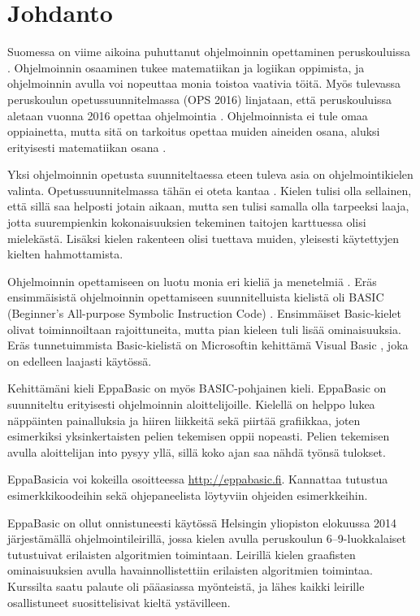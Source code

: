 
\section{Johdanto}
Suomessa on viime aikoina
puhuttanut ohjelmoinnin
opettaminen peruskouluissa
\cite{hs_kiuru}\cite{hs_eka}.
Ohjelmoinnin osaaminen
tukee matematiikan ja logiikan
oppimista, ja ohjelmoinnin
avulla voi nopeuttaa monia
toistoa vaativia töitä.
Myös tulevassa peruskoulun
opetussuunnitelmassa (OPS 2016)
linjataan, että peruskouluissa aletaan
vuonna 2016 opettaa ohjelmointia
\cite{OPS_2016}.
Ohjelmoinnista ei tule omaa oppiainetta,
mutta sitä on tarkoitus opettaa muiden
aineiden osana, aluksi erityisesti
matematiikan osana \cite{OPS_2016}\cite{hs_eka}.

Yksi ohjelmoinnin opetusta suunniteltaessa eteen tuleva
asia on ohjelmointikielen valinta.
Opetussuunnitelmassa tähän ei
oteta kantaa \cite{hs_eka}.
Kielen tulisi olla sellainen,
että sillä saa helposti jotain aikaan,
mutta sen tulisi samalla olla tarpeeksi laaja,
jotta suurempienkin kokonaisuuksien tekeminen
taitojen karttuessa olisi mielekästä.
Lisäksi kielen rakenteen olisi tuettava muiden,
yleisesti käytettyjen kielten hahmottamista.

Ohjelmoinnin opettamiseen
on luotu monia eri kieliä ja menetelmiä
\cite{language_history}.
Eräs ensimmäisistä ohjelmoinnin opettamiseen
suunnitelluista kielistä oli BASIC
(Beginner's All-purpose Symbolic Instruction Code)
\cite{basic}.
Ensimmäiset Basic-kielet olivat toiminnoiltaan rajoittuneita,
mutta pian kieleen tuli lisää ominaisuuksia.
Eräs tunnetuimmista Basic-kielistä on
Microsoftin kehittämä Visual Basic
\cite{vb.net},
joka on edelleen laajasti käytössä.

Kehittämäni kieli EppaBasic
on myös
BASIC-pohjainen kieli.
EppaBasic on suunniteltu
erityisesti ohjelmoinnin aloittelijoille.
Kielellä on helppo lukea
näppäinten painalluksia
ja hiiren liikkeitä
sekä piirtää grafiikkaa,
joten esimerkiksi yksinkertaisten
pelien tekemisen oppii nopeasti.
Pelien tekemisen avulla aloittelijan into pysyy yllä,
sillä koko ajan saa nähdä työnsä tulokset.

EppaBasicia voi kokeilla osoitteessa
\url{http://eppabasic.fi}.
Kannattaa tutustua esimerkkikoodeihin
sekä ohjepaneelista löytyviin
ohjeiden esimerkkeihin.

EppaBasic on ollut onnistuneesti käytössä
Helsingin yliopiston elokuussa 2014
järjestämällä ohjelmointileirillä,
jossa kielen avulla peruskoulun
6--9-luokkalaiset
tutustuivat erilaisten algoritmien toimintaan.
Leirillä kielen graafisten ominaisuuksien
avulla havainnollistettiin erilaisten
algoritmien toimintaa.
Kurssilta saatu palaute oli pääasiassa myönteistä,
ja lähes kaikki leirille osallistuneet
suosittelisivat kieltä ystävilleen.

